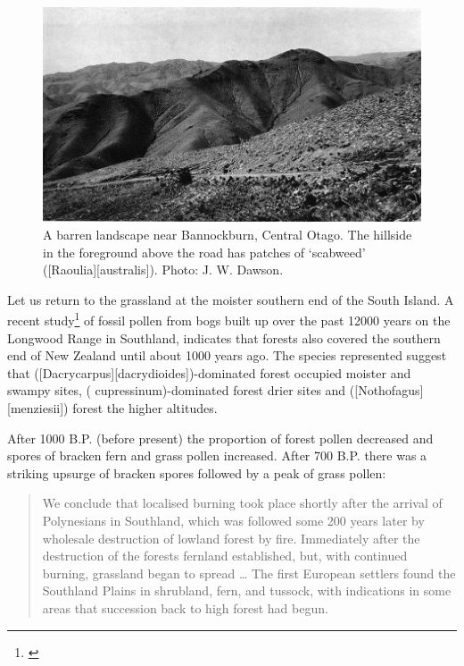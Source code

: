 \begin{figure}[t]
	\centering
	\includegraphics[width=\textwidth]{graphics/figure86barren.jpg}
	\caption[A barren landscape near Bannockburn]{A barren landscape near Bannockburn, Central Otago.
	The hillside in the foreground above the road has patches of `scabweed' ([Raoulia][australis]).
	Photo:  J. W. Dawson.}%
	\label{fig:86barren}
\end{figure}

Let us return to the  grassland at the moister southern end of the South Island.
A recent study\footnote{\cite{mcglone1983vegetation}} of fossil pollen from bogs built up over the past 12000 years on the Longwood Range in Southland, indicates that forests also covered the southern end of New Zealand until about 1000 years ago.
The species represented suggest that  ([Dacrycarpus][dacrydioides])-dominated forest occupied moister and swampy sites,  ( cupressinum)-dominated forest drier sites and  ([Nothofagus][menziesii]) forest the higher altitudes.

After 1000 B.P. (before present) the proportion of forest pollen decreased and spores of bracken fern and grass pollen increased.
After 700 B.P. there was a striking upsurge of bracken spores followed by a peak of grass pollen:

\begin{quote}
	We conclude that localised burning took place shortly after the arrival of Polynesians in Southland, which was followed some 200 years later by wholesale destruction of lowland forest by fire.
	Immediately after the destruction of the forests fernland established, but, with continued burning, grassland began to spread … The first European settlers found the Southland Plains in shrubland, fern, and tussock, with indications in some areas that succession back to high forest had begun.
\end{quote}

